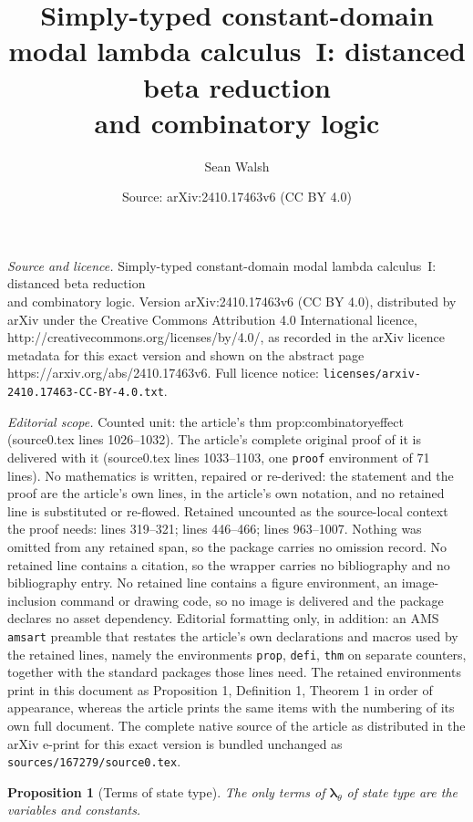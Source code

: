 \documentclass[10pt,a4paper]{amsart}
\title{Simply-typed constant-domain modal lambda calculus~I: distanced beta reduction\texorpdfstring{\\}{} and combinatory logic}
\author{Sean Walsh}
\date{Source: arXiv:2410.17463v6 (CC BY 4.0)}
\newtheorem{prop}{Proposition}
\newcommand{\mltup}{\boldsymbol\lambda_{\param}}
\newcommand{\param}{\theta}
\begin{document}
\maketitle

\noindent\emph{Source and licence.} Simply-typed constant-domain modal lambda calculus~I: distanced beta reduction\texorpdfstring{\\}{} and combinatory logic. Version arXiv:2410.17463v6 (CC BY 4.0), distributed by arXiv under the Creative Commons Attribution 4.0 International licence, http://creativecommons.org/licenses/by/4.0/, as recorded in the arXiv licence metadata for this exact version and shown on the abstract page https://arxiv.org/abs/2410.17463v6. Full licence notice: \texttt{licenses/arxiv-2410.17463-CC-BY-4.0.txt}.\par\smallskip

\noindent\textit{Editorial scope.} Counted unit: the article's thm prop:combinatoryeffect (source0.tex lines 1026--1032). The article's complete original proof of it is delivered with it (source0.tex lines 1033--1103, one \texttt{proof} environment of 71 lines). No mathematics is written, repaired or re-derived: the statement and the proof are the article's own lines, in the article's own notation, and no retained line is substituted or re-flowed.  Retained uncounted as the source-local context the proof needs: lines 319--321; lines 446--466; lines 963--1007.  Nothing was omitted from any retained span, so the package carries no omission record.  No retained line contains a citation, so the wrapper carries no bibliography and no bibliography entry.  No retained line contains a figure environment, an image-inclusion command or drawing code, so no image is delivered and the package declares no asset dependency.  Editorial formatting only, in addition: an AMS \texttt{amsart} preamble that restates the article's own declarations and macros used by the retained lines, namely the environments \texttt{prop}, \texttt{defi}, \texttt{thm} on separate counters, together with the standard packages those lines need.  The retained environments print in this document as Proposition 1, Definition 1, Theorem 1 in order of appearance, whereas the article prints the same items with the numbering of its own full document.  The complete native source of the article as distributed in the arXiv e-print for this exact version is bundled unchanged as \texttt{sources/167279/source0.tex}.
\begin{prop}[Terms of state type]\label{prop:state-free}
The only terms of $\mltup$ of state type are the variables and constants.
\end{prop}
\end{document}
